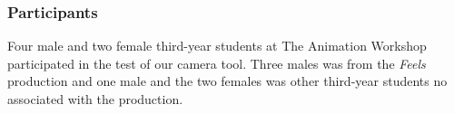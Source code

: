 \subsubsection{Participants}
Four male and two female third-year students at The Animation Workshop participated in the test of our camera tool. Three males was from the \textit{Feels} production and one male and the two females was other third-year students no associated with the production. 